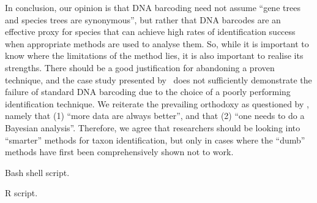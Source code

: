 \documentclass[12pt]{article}
\begin{document}
In conclusion, our opinion is that DNA barcoding need not assume ``gene trees and species trees are synonymous'', but rather that DNA barcodes are an effective proxy for species that can achieve high rates of identification success when appropriate methods are used to analyse them. So, while it is important to know where the limitations of the method lies, it is also important to realise its strengths. There should be a good justification for abandoning a proven technique, and the case study presented by \citeauthor{Dowton2014}\ does not sufficiently demonstrate the failure of standard DNA barcoding due to the choice of a poorly performing identification technique.  We reiterate the prevailing orthodoxy as questioned by \citep{Karl2012}, namely that (1) ``more data are always better'', and that (2) ``one needs to do a Bayesian analysis''. Therefore, we agree that researchers should be looking into ``smarter'' methods for taxon identification, but only in cases where the ``dumb'' methods have first been comprehensively shown not to work.





\clearpage
\newpage

\begin{Supplementary Data}
\caption{Bash shell script. }
\label{suppl:bash}
\end{Supplementary Data}

\begin{Supplementary Data}
\caption{R script. }
\label{suppl:R}
\end{Supplementary Data}
\end{document}
